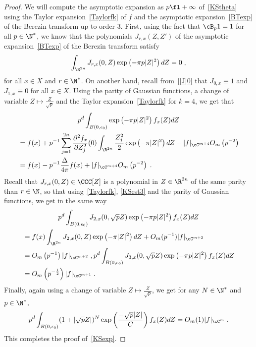 \begin{proof}
We will compute the asymptotic expansion as $p\fl+\infty$ of~\eqref{KStheta} using the Taylor expansion~\eqref{Taylorfk} of $f$ and the asymptotic expansion~\eqref{BTexp} of the Berezin transform up to order $3$. First, using the fact that $\cB_p 1=1$ for all $p\in\N^*$, we know that the polynomials $J_{r,x}(Z,Z')$ of the asymptotic expansion~\eqref{BTexp} of the Berezin transform satisfy
\begin{equation}\label{KSest3}
\int_{\R^{2n}}J_{r,x}(0,Z)\exp\left(-\pi p|Z|^2\right)dZ=0\;,
\end{equation}
for all $x\in X$ and $r\in\N^*$. On another hand, recall from~\eqref{|J|0} that $J_{0,x}\equiv 1$ and $J_{1,x}\equiv 0$ for all $x\in X$. Using the parity of Gaussian functions, a change of variable $Z\mapsto \frac{Z}{\sqrt{p}}$ and the Taylor expansion~\eqref{Taylorfk} for $k=4$, we get that
\begin{multline}\label{KSest1}
p^d\int_{B(0,\epsilon_0)}\exp\left(-\pi p|Z|^2\right)f_x(Z)dZ\\
\begin{aligned}
&=f(x) +p^{-1}\sum_{j=1}^{2n}\frac{\partial^2 f_{x}}{\partial Z^2_j}(0)
\int_{\R^{2n}}\frac{Z_j^2}{2}\exp\left(-\pi |Z|^2\right)dZ+ |f|_{\cC^{m+4}}O_m\left(p^{-2}\right)\\
&=f(x)-p^{-1}\frac{\Delta}{4\pi}f(x)+|f|_{\cC^{m+4}}O_m\left(p^{-2}\right)\;.
\end{aligned}
\end{multline}
Recall that $J_{r,x}(0,Z)\in\CCC[Z]$ is a polynomial in $Z\in\R^{2n}$ of the same parity than $r\in\N$, so that using~\eqref{Taylorfk}, \eqref{KSest3} and the parity of Gaussian functions, we get in the same way
\begin{multline}\label{KSest2}
p^d\int_{B(0,\epsilon_0)} J_{2,x}(0,\sqrt{p}Z) \exp\left(-\pi p|Z|^2\right)f_x(Z)dZ\\
\begin{aligned}
&=f(x)\int_{\R^{2n}}J_{2,x}(0,Z)\exp\left(-\pi|Z|^2\right)dZ+O_m(p^{-1}) |f|_{\cC^{m+2}}\\
&=O_m\left(p^{-1}\right)|f|_{\cC^{m+2}}\;,
p^d\int_{B(0,\epsilon_0)} J_{3,x}(0,\sqrt{p}Z) \exp\left(-\pi p|Z|^2\right)f_x(Z)dZ\\
&=O_m\left(p^{-\frac{1}{2}}\right)|f|_{\cC^{m+1}}\;.
\end{aligned}
\end{multline}
Finally, again using a change of variable $Z\mapsto \frac{Z}{\sqrt{p}}$, we get for any $N\in\N^*$ and $p\in\N^*$,
\begin{equation}\label{KSest4}
p^d\int_{B(0,\epsilon_0)}(1+|\sqrt{p}Z|)^N\exp\left(\frac{-\sqrt{p}|Z|}{C}\right)f_x(Z)dZ =O_m(1)|f|_{\cC^m}\;.
\end{equation}
This completes the proof of~\eqref{KSexp}.
\end{proof}


